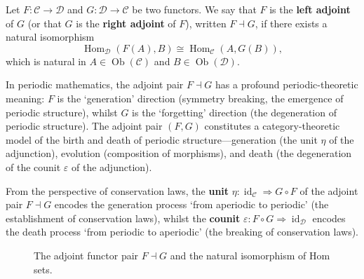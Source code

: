 \begin{definition}\label{def:adjoint_functor}
Let $F: \mathcal{C} \to \mathcal{D}$ and $G: \mathcal{D} \to \mathcal{C}$ be two functors. We say that $F$ is the \textbf{left adjoint} of $G$ (or that $G$ is the \textbf{right adjoint} of $F$), written $F \dashv G$, if there exists a natural isomorphism
\[
\operatorname{Hom}_{\mathcal{D}}(F(A), B) \cong \operatorname{Hom}_{\mathcal{C}}(A, G(B)),
\]
which is natural in $A \in \operatorname{Ob}(\mathcal{C})$ and $B \in \operatorname{Ob}(\mathcal{D})$.
\end{definition}

\begin{remark}\label{rem:adjunction_periodic_lifecycle}
In periodic mathematics, the adjoint pair $F \dashv G$ has a profound periodic-theoretic meaning: $F$ is the `generation' direction (symmetry breaking, the emergence of periodic structure), whilst $G$ is the `forgetting' direction (the degeneration of periodic structure). The adjoint pair $(F, G)$ constitutes a category-theoretic model of the birth and death of periodic structure---generation (the unit $\eta$ of the adjunction), evolution (composition of morphisms), and death (the degeneration of the counit $\varepsilon$ of the adjunction).

From the perspective of conservation laws, the \textbf{unit} $\eta: \operatorname{id}_{\mathcal{C}} \Rightarrow G \circ F$ of the adjoint pair $F \dashv G$ encodes the generation process `from aperiodic to periodic' (the establishment of conservation laws), whilst the \textbf{counit} $\varepsilon: F \circ G \Rightarrow \operatorname{id}_{\mathcal{D}}$ encodes the death process `from periodic to aperiodic' (the breaking of conservation laws).
\end{remark}

\begin{figure}[htbp]
\centering
{}
\vspace{0.3cm}
\caption{The adjoint functor pair $F\dashv G$ and the natural isomorphism of Hom sets.}
\label{fig:adjoint_functor}
\end{figure}

